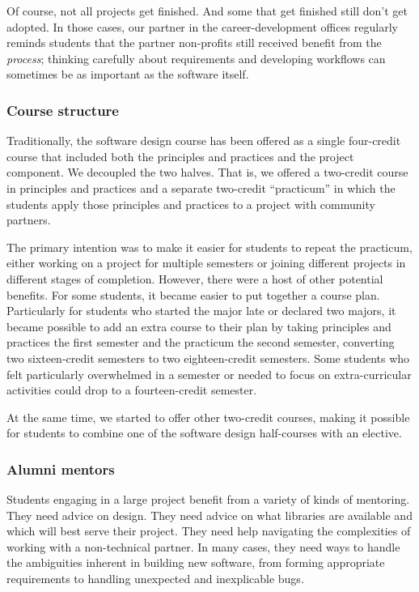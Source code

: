 Of course, not all projects get finished.  And some that get finished
still don't get adopted.  In those cases, our partner in the 
career-development offices regularly reminds students that the
partner non-profits still received benefit from the \textit{process};
thinking carefully about requirements and developing workflows can
sometimes be as important as the software itself.

\subsubsection{Course structure}

Traditionally, the software design course has been offered as a single
four-credit course that included both the principles and practices and
the project component.  We decoupled the two halves.  That is, we 
offered a two-credit course in principles and practices and
a separate two-credit ``practicum'' in which the students apply
those principles and practices to a project with community partners.

The primary intention was to make it easier for students to repeat
the practicum, either working on a project for multiple semesters
or joining different projects in different stages of completion.
However, there were a host of other potential benefits.  For some
students, it became easier to put together a course plan. Particularly
for students who started the major late or declared two
majors, it became possible to add an extra course to their plan by
taking principles and practices the first semester and
the practicum the second semester,
converting two sixteen-credit semesters to two eighteen-credit
semesters. 
Some students who felt particularly
overwhelmed in a semester or needed to focus on extra-curricular activities
could drop to a fourteen-credit semester.

At the same time, we started to offer other two-credit
courses, making it possible for students to combine
one of the software design half-courses with an elective.

\subsubsection{Alumni mentors}

Students engaging in a large project benefit from a variety of kinds
of mentoring.  They need advice on design.  They need advice on
what libraries are available and which will best serve their
project.  They need help navigating the complexities of working
with a non-technical partner.  In many cases, they need ways to
handle the ambiguities inherent in building new software, from
forming appropriate requirements to handling unexpected and
inexplicable bugs.

